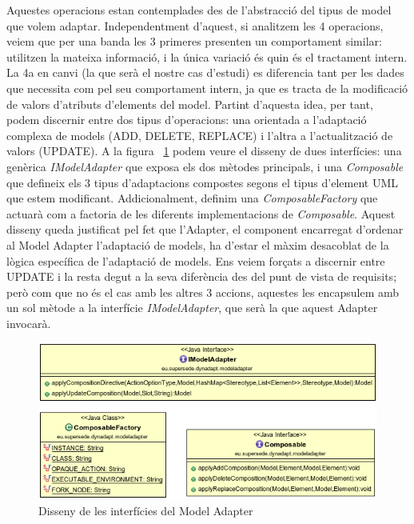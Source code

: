 Aquestes operacions estan contemplades des de l'abstracció del tipus de model que volem adaptar. Independentment d'aquest, si analitzem les 4 operacions, veiem que per una banda les 3 primeres presenten un comportament similar: utilitzen la mateixa informació, i la única variació és quin és el tractament intern. La 4a en canvi (la que serà el nostre cas d'estudi) es diferencia tant per les dades que necessita com pel seu comportament intern, ja que es tracta de la modificació de valors d'atributs d'elements del model. Partint d'aquesta idea, per tant, podem discernir entre dos tipus d'operacions: una orientada a l'adaptació complexa de models (ADD, DELETE, REPLACE) i l'altra a l'actualització de valors (UPDATE). A la figura ~\ref{fig:Figura28} podem veure el disseny de dues interfícies: una genèrica \textit{IModelAdapter} que exposa els dos mètodes principals, i una \textit{Composable} que defineix els 3 tipus d'adaptacions compostes segons el tipus d'element UML que estem modificant. Addicionalment, definim una \textit{ComposableFactory} que actuarà com a factoria de les diferents implementacions de \textit{Composable}. Aquest disseny queda justificat pel fet que l'Adapter, el component encarregat d'ordenar al Model Adapter l'adaptació de models, ha d'estar el màxim desacoblat de la lògica específica de l'adaptació de models. Ens veiem forçats a discernir entre UPDATE i la resta degut a la seva diferència des del punt de vista de requisits; però com que no és el cas amb les altres 3 accions, aquestes les encapsulem amb un sol mètode a la interfície \textit{IModelAdapter}, que serà la que aquest Adapter invocarà.\\

\begin{figure}
\centering
\includegraphics[width=13cm]{Figures/Figure28}
\decoRule
\caption{Disseny de les interfícies del Model Adapter}
\label{fig:Figura28}
\end{figure}

